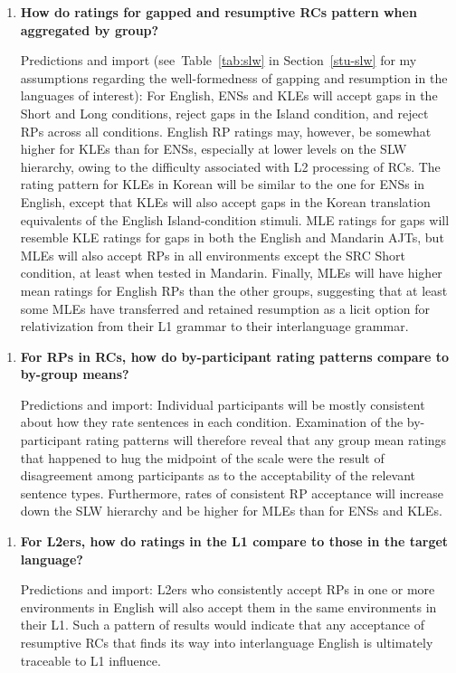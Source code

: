 \begin{enumerate}[\bfseries RQ1:,itemsep=5pt]
\item {\bfseries How do ratings for gapped and resumptive RCs pattern when aggregated by group?}\par\nobreak
Predictions and import (see~Table~\ref{tab:slw} in Section~\ref{stu-slw} for my assumptions regarding the well-formedness of gapping and resumption in the languages of interest): For English, ENSs and KLEs will accept gaps in the Short and Long conditions, reject gaps in the Island condition, and reject RPs across all conditions. English RP ratings may, however, be somewhat higher for KLEs than for ENSs, especially at lower levels on the SLW hierarchy, owing to the difficulty associated with L2 processing of RCs. The rating pattern for KLEs in Korean will be similar to the one for ENSs in English, except that KLEs will also accept gaps in the Korean translation equivalents of the English Island-condition stimuli. MLE ratings for gaps will resemble KLE ratings for gaps in both the English and Mandarin AJTs, but MLEs will also accept RPs in all environments except the SRC Short condition, at least when tested in Mandarin. Finally, MLEs will have higher mean ratings for English RPs than the other groups, suggesting that at least some MLEs have transferred and retained resumption as a licit option for relativization from their L1 grammar to their interlanguage grammar.
\end{enumerate}\vspace{5pt}

\begin{enumerate}[\bfseries RQ2:,itemsep=5pt]
\item {\bfseries For RPs in RCs, how do by-participant rating patterns compare to by-group means?}\par\nobreak
Predictions and import: Individual participants will be mostly consistent about how they rate sentences in each condition. Examination of the by-participant rating patterns will therefore reveal that any group mean ratings that happened to hug the midpoint of the scale were the result of disagreement among participants as to the acceptability of the relevant sentence types. Furthermore, rates of consistent RP acceptance will increase down the SLW hierarchy and be higher for MLEs than for ENSs and KLEs.
\end{enumerate}\vspace{5pt}

\begin{enumerate}[\bfseries RQ3:,itemsep=5pt]
\item {\bfseries For L2ers, how do ratings in the L1 compare to those in the target language?}\par\nobreak
Predictions and import: L2ers who consistently accept RPs in one or more environments in English will also accept them in the same environments in their L1. Such a pattern of results would indicate that any acceptance of resumptive RCs that finds its way into interlanguage English is ultimately traceable to L1 influence.
\end{enumerate}\vspace{5pt}

